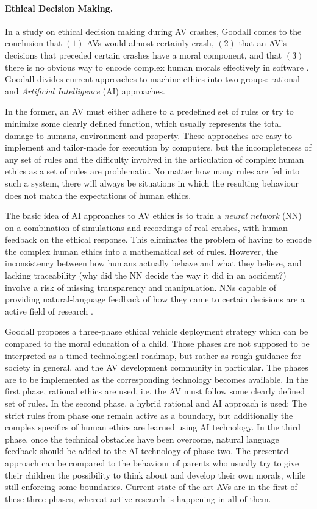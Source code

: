 \documentclass[11pt]{article}
\begin{document}
\paragraph{Ethical Decision Making.}
\label{sec:ethics}
In a study on ethical decision making during AV crashes, Goodall comes to the conclusion that $(1)$ AVs would almost certainly crash, $(2)$ that an AV's decisions that preceded certain crashes have a moral component, and that $(3)$ there is no obvious way to encode complex human morals effectively in software \cite{Goodall2014ethical}. Goodall divides current approaches to machine ethics into two groups: rational and \textit{Artificial Intelligence} (AI) approaches.

In the former, an AV must either adhere to a predefined set of rules or try to minimize some clearly defined function, which usually represents the total damage to humans, environment and property. These approaches are easy to implement and tailor-made for execution by computers, but the incompleteness of any set of rules and the difficulty involved in the articulation of complex human ethics as a set of rules are problematic. No matter how many rules are fed into such a system, there will always be situations in which the resulting behaviour does not match the expectations of human ethics.

The basic idea of AI approaches to AV ethics is to train a \textit{neural network} (NN) on a combination of simulations and recordings of real crashes, with human feedback on the ethical response. This eliminates the problem of having to encode the complex human ethics into a mathematical set of rules. However, the inconsistency between how humans actually behave and what they believe, and lacking traceability (why did the NN decide the way it did in an accident?) involve a risk of missing transparency and manipulation. NNs capable of providing natural-language feedback of how they came to certain decisions are a active field of research \cite[p. 63]{Goodall2014ethical}.

Goodall proposes a three-phase ethical vehicle deployment strategy \cite[p.63]{Goodall2014ethical} which can be compared to the moral education of a child. Those phases are not supposed to be interpreted as a timed technological roadmap, but rather as rough guidance for society in general, and the AV development community in particular. The phases are to be implemented as the corresponding technology becomes available. In the first phase, rational ethics are used, i.e. the AV must follow some clearly defined set of rules. In the second phase, a hybrid rational and AI approach is used: The strict rules from phase one remain active as a boundary, but additionally the complex specifics of human ethics are learned using AI technology. In the third phase, once the technical obstacles have been overcome, natural language feedback should be added to the AI technology of phase two. The presented approach can be compared to the behaviour of parents who usually try to give their children the possibility to think about and develop their own morals, while still enforcing some boundaries. Current state-of-the-art AVs are in the first of these three phases, whereat active research is happening in all of them.
\end{document}
